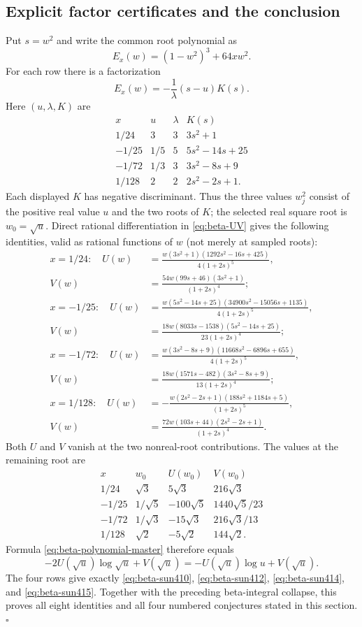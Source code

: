\documentclass[11pt,a4paper]{article}
\theoremstyle{remark}\newtheorem{remark}[theorem]{Remark}
\numberwithin{equation}{section}
\begin{document}
\subsection{Explicit factor certificates and the conclusion}
Put $s=w^2$ and write the common root polynomial as
\[
 E_x(w)=(1-w^2)^3+64xw^2.
\]
For each row there is a factorization
\begin{equation}
 E_x(w)=-\frac1\lambda(s-u)K(s).
 \label{eq:beta-E-factor}
\end{equation}
Here $(u,\lambda,K)$ are
\[
 \begin{array}{c|c|c|l}
 x&u&\lambda&K(s)\\\hline
 1/24&3&3&3s^2+1\\
 -1/25&1/5&5&5s^2-14s+25\\
 -1/72&1/3&3&3s^2-8s+9\\
 1/128&2&2&2s^2-2s+1.
 \end{array}
\]
Each displayed $K$ has negative discriminant. Thus the three values
$w_j^2$ consist of the positive real value $u$ and the two roots of $K$;
the selected real square root is $w_0=\sqrt u$.
Direct rational differentiation in \eqref{eq:beta-UV} gives the following
identities, valid as rational functions of $w$ (not merely at sampled
roots):
\begin{align*}
 x=1/24:\quad
 U(w)&=\frac{w(3s^2+1)(1292s^2-16s+425)}{4(1+2s)^5},\\
 V(w)&=\frac{54w(99s+46)(3s^2+1)}{(1+2s)^4};\\[2pt]
 x=-1/25:\quad
 U(w)&=\frac{w(5s^2-14s+25)(34900s^2-15056s+1135)}
 {4(1+2s)^5},\\
 V(w)&=\frac{18w(8033s-1538)(5s^2-14s+25)}{23(1+2s)^4};\\[2pt]
 x=-1/72:\quad
 U(w)&=\frac{w(3s^2-8s+9)(11668s^2-6896s+655)}
 {4(1+2s)^5},\\
 V(w)&=\frac{18w(1571s-482)(3s^2-8s+9)}{13(1+2s)^4};\\[2pt]
 x=1/128:\quad
 U(w)&=-\frac{w(2s^2-2s+1)(188s^2+1184s+5)}{(1+2s)^5},\\
 V(w)&=\frac{72w(103s+44)(2s^2-2s+1)}{(1+2s)^4}.
\end{align*}
Both $U$ and $V$ vanish at the two nonreal-root contributions.
The values at the remaining root are
\[
 \begin{array}{c|c|c|c}
 x&w_0&U(w_0)&V(w_0)\\\hline
 1/24&\sqrt3&5\sqrt3&216\sqrt3\\
 -1/25&1/\sqrt5&-100\sqrt5&1440\sqrt5/23\\
 -1/72&1/\sqrt3&-15\sqrt3&216\sqrt3/13\\
 1/128&\sqrt2&-5\sqrt2&144\sqrt2.
 \end{array}
\]
Formula \eqref{eq:beta-polynomial-master} therefore equals
\[
 -2U(\sqrt u)\log\sqrt u+V(\sqrt u)
 =-U(\sqrt u)\log u+V(\sqrt u).
\]
The four rows give exactly \eqref{eq:beta-sun410},
\eqref{eq:beta-sun412}, \eqref{eq:beta-sun414}, and
\eqref{eq:beta-sun415}. Together with the preceding beta-integral
collapse, this proves all eight identities and all four numbered
conjectures stated in this section.\hfill$\square$
\end{document}

